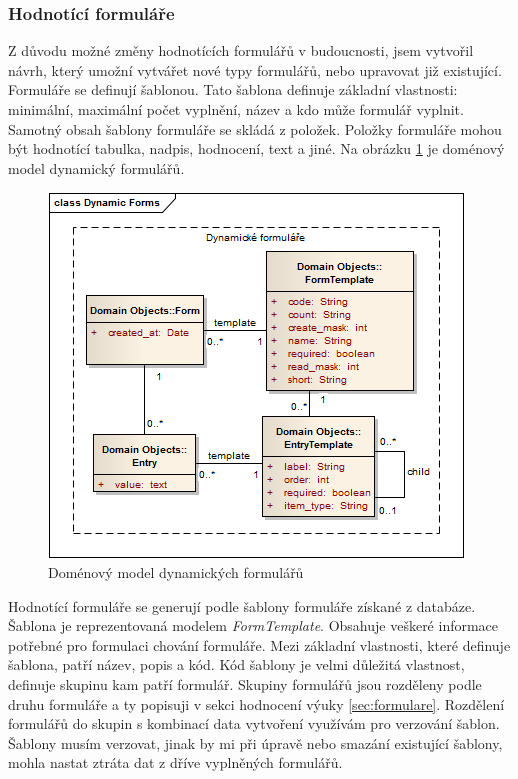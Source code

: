 \subsubsection{Hodnotící formuláře}
Z důvodu možné změny hodnotících formulářů v budoucnosti, jsem vytvořil návrh, který umožní vytvářet nové typy formulářů, nebo upravovat již existující. Formuláře se definují šablonou. Tato šablona definuje základní vlastnosti: minimální, maximální počet vyplnění, název a kdo může formulář vyplnit. Samotný obsah šablony formuláře se skládá z položek. Položky formuláře mohou být hodnotící tabulka, nadpis, hodnocení, text a jiné. Na obrázku \ref{fig:dynamicform} je doménový model dynamický formulářů. 

\begin{figure}[h]
\begin{center}
\includegraphics[scale=0.6]{figures/DynamicForms}
\caption{Doménový model dynamických formulářů}
\label{fig:dynamicform}
\end{center}
\end{figure}

Hodnotící formuláře se generují podle šablony formuláře získané z databáze. Šablona je reprezentovaná modelem \textit{FormTemplate}. Obsahuje veškeré informace potřebné pro formulaci chování formuláře. Mezi základní vlastnosti, které definuje šablona, patří název, popis a kód. Kód šablony je velmi důležitá vlastnost, definuje skupinu kam patří formulář. Skupiny formulářů jsou rozděleny podle druhu formuláře a ty popisuji v sekci hodnocení výuky \ref{sec:formulare}. Rozdělení formulářů do skupin s kombinací data vytvoření využívám pro verzování šablon. Šablony musím verzovat, jinak by mi při úpravě nebo smazání existující šablony, mohla nastat ztráta dat z  dříve vyplněných formulářů.

